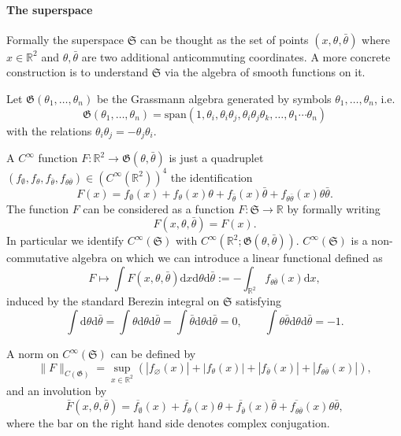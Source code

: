 \documentclass[a4paper,10pt]{article}
\newcommand{\assign}{:=}
\newcommand{\mathd}{\mathrm{d}}
\begin{document}
\paragraph{The superspace}

Formally the superspace $\mathfrak{S}$ can be thought as the set of points
$(x, \theta, \bar{\theta})$ where $x \in \mathbb{R}^2$ and $\theta,
\bar{\theta}$ are two additional anticommuting coordinates. A more concrete
construction is to understand $\mathfrak{S}$ via the algebra of smooth
functions on it.

Let $\mathfrak{G} (\theta_1, \ldots, \theta_n)$ be the Grassmann algebra
generated by symbols $\theta_1, \ldots, \theta_n$, i.e. \[\mathfrak{G}
(\theta_1, \ldots, \theta_n) = \text{span} (1, \theta_i, \theta_i \theta_j,
\theta_i \theta_j \theta_k, \ldots, \theta_1 \cdots \theta_n)\]
 with the
relations $\theta_i \theta_j = - \theta_j \theta_i$.

A $C^{\infty}$ function $F : \mathbb{R}^2 \rightarrow \mathfrak{G} (\theta,
\bar{\theta})$ is just a quadruplet $(f_{\emptyset}, f_{\theta},
f_{\bar{\theta}}, f_{\theta \bar{\theta}}) \in (C^{\infty} (\mathbb{R}^2))^4$
the identification
\[ F (x) = f_{\emptyset} (x) + f_{\theta} (x) \theta + f_{\bar{\theta}} (x)
   \bar{\theta} + f_{\theta \bar{\theta}} (x) \theta \bar{\theta} . \]
The function $F$ can be considered as a function $F : \mathfrak{S} \rightarrow
\mathbb{R}$ by formally writing
\[ F (x, \theta, \bar{\theta}) = F (x) . \]
In particular we identify $C^{\infty} (\mathfrak{S})$ with $C^{\infty}
(\mathbb{R}^2 ; \mathfrak{G} (\theta, \bar{\theta}))$. $C^{\infty}
(\mathfrak{S})$ is a non-commutative algebra on which we can introduce a
linear functional defined as
\[ F \mapsto \int F (x, \theta, \bar{\theta}) \mathd x \mathd \theta \mathd
   \bar{\theta} \assign - \int_{\mathbb{R}^2} f_{\theta \bar{\theta}} (x)
   \mathd x, \]
induced by the standard Berezin integral on $\mathfrak{S}$ satisfying
\[ \int \mathd \theta \mathd \bar{\theta} = \int \theta \mathd \theta \mathd
   \bar{\theta} = \int \bar{\theta} \mathd \theta \mathd \bar{\theta} = 0,
   \qquad \int \theta \bar{\theta} \mathd \theta \mathd \bar{\theta} = - 1. \]
\begin{remark}
  A norm on $C^{\infty} (\mathfrak{S})$ can be defined by
  \[ \| F \|_{C (\mathfrak{G})} = \sup_{x \in \mathbb{R}^2} (| f_{\varnothing}
     (x) | + | f_{\theta} (x) | + | f_{\bar{\theta}} (x) | + | f_{\theta
     \bar{\theta}} (x) |), \]
  and an involution by
  \[ \bar{F} (x, \theta, \bar{\theta}) = \overline{f_{\emptyset}} (x) +
     \overline{f_{\theta}} (x) \theta + \overline{f_{\bar{\theta}}} (x)
     \bar{\theta} + \overline{f_{\theta \bar{\theta}}} (x) \theta
     \bar{\theta}, \]
  where the bar on the right hand side denotes complex conjugation.
\end{remark}
\end{document}
